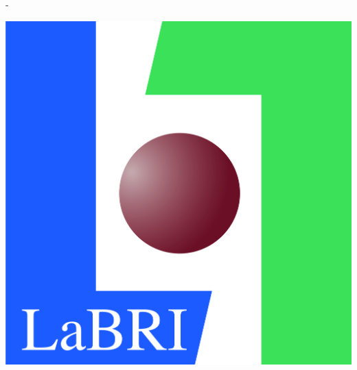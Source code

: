 \begin{titlingpage}
\begin{SingleSpace}
\begin{adjustwidth*}{\unitlength}{-\unitlength}
\begin{center}
\vspace{.5cm}
{\includegraphics[scale=.23]{logos/labri}}

\end{center}

\end{adjustwidth*}

\end{SingleSpace}
\end{titlingpage}
